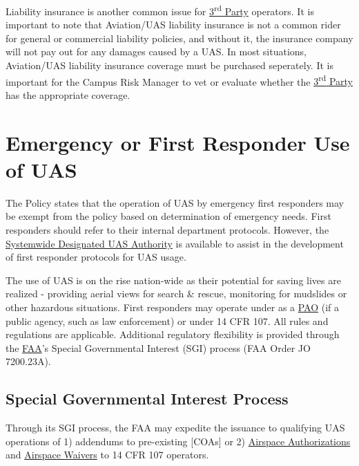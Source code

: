 \documentclass[
]{book}
\begin{document}
Liability insurance is another common issue for \protect\hyperlink{rdparty}{3\textsuperscript{rd} Party} operators. It is important to note that Aviation/UAS liability insurance is not a common rider for general or commercial liability policies, and without it, the insurance company will not pay out for any damages caused by a UAS. In most situations, Aviation/UAS liability insurance coverage must be purchased seperately. It is important for the Campus Risk Manager to vet or evaluate whether the \protect\hyperlink{rdparty}{3\textsuperscript{rd} Party} has the appropriate coverage.

\hypertarget{emergency-or-first-responder-use-of-uas}{%
\section{Emergency or First Responder Use of UAS}\label{emergency-or-first-responder-use-of-uas}}

The Policy states that the operation of UAS by emergency first responders may be exempt from the policy based on determination of emergency needs. First responders should refer to their internal department protocols. However, the \protect\hyperlink{SDA}{Systemwide Designated UAS Authority} is available to assist in the development of first responder protocols for UAS usage.

The use of UAS is on the rise nation-wide as their potential for saving lives are realized - providing aerial views for search \& rescue, monitoring for mudslides or other hazardous situations. First responders may operate under as a \protect\hyperlink{PAO}{PAO} (if a public agency, such as law enforcement) or under 14 CFR 107. All rules and regulations are applicable. Additional regulatory flexibility is provided through the \protect\hyperlink{FAA}{FAA}'s Special Governmental Interest (SGI) process (FAA Order JO 7200.23A).

\hypertarget{special-governmental-interest-process}{%
\subsection{Special Governmental Interest Process}\label{special-governmental-interest-process}}

Through its SGI process, the FAA may expedite the issuance to qualifying UAS operations of 1) addendums to pre-existing {[}COAs{]} or 2) \protect\hyperlink{AA}{Airspace Authorizations} and \protect\hyperlink{AW}{Airspace Waivers} to 14 CFR 107 operators.
\end{document}
